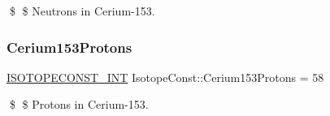 \$ \$ Neutrons in Cerium-\/153. \mbox{\label{group___isotope_const-_cerium-_ce153_gad6efdfdf9998500c7ceca2f13850862a}} 
\subsubsection{\texorpdfstring{Cerium153\+Protons}{Cerium153Protons}}
{\footnotesize\ttfamily \mbox{\hyperlink{group___isotope_const-_macros_ga5f18360b3e99483a35c32d789e62621c}{I\+S\+O\+T\+O\+P\+E\+C\+O\+N\+S\+T\+\_\+\+I\+NT}} Isotope\+Const\+::\+Cerium153\+Protons = 58}

\$ \$ Protons in Cerium-\/153. 